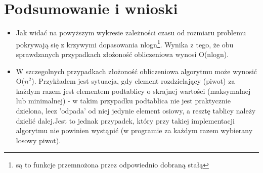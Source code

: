 \documentclass{mwart}
\begin{document}
\section{Podsumowanie i wnioski}
\begin{itemize}
\item Jak widać na powyższym wykresie zależności czasu od rozmiaru problemu pokrywają się z krzywymi dopasowania nlogn\footnote{są to funkcje przemnożona przez odpowiednio dobraną stałą}. Wynika z tego, że obu sprawdzanych przypadkach złożoność obliczeniowa wynosi O(nlogn). 
\item W szczegolnych przypadkach złożoność obliczeniowa algorytmu może wynosić O($n^{2}$). Przykładem jest sytuacja, gdy element rozdzielający (piwot) za każdym razem jest elementem podtablicy o skrajnej wartości (maksymalnej lub minimalnej) - w takim przypadku podtablica nie jest praktycznie dzielona, lecz 'odpada' od niej jedynie element osiowy, a resztę tablicy należy dzielić dalej.Jest to jednak przypadek, który przy takiej implementacji algorytmu nie powinien wystąpić (w programie za każdym razem wybierany losowy piwot).
\end{itemize}
\end{document}
